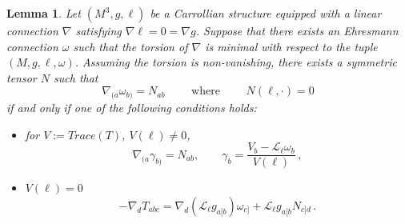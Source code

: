 \documentclass[10pt,a4paper]{amsart}
\newtheorem{lemma}{Lemma}
\begin{document}
\begin{lemma} \label{nonvanishing-torsion-lemma}
    Let $(M^3,g,\ell)$ be a Carrollian structure equipped with a linear connection $\nabla$ satisfying $\nabla \ell = 0 = \nabla g$.
    Suppose that there exists an Ehresmann connection $\omega$ such that the torsion of $\nabla$ is minimal with respect to the tuple $(M,g,\ell,\omega)$. Assuming the torsion is non-vanishing, there exists a symmetric tensor $N$ such that
    $$\nabla_{(a} \omega_{b)} = N_{ab}\qquad \text{ where } \qquad N(\ell, \cdot) = 0$$
    if and only if one of the following conditions holds:
        \begin{itemize}
        \item for $V := Trace(T)$,  $V(\ell) \neq 0$, 
        $$\nabla_{(a}\gamma_{b)} = N_{ab}, \qquad \gamma_b = \frac{V_b-\mathcal{L}_\ell \omega_b}{V(\ell)} \,, $$
        \item $V(\ell) = 0$  
        $$-\nabla_d T_{abc} = \nabla_d (\mathcal{L}_\ell g_{a[b}) \omega_{c]} + \mathcal{L}_\ell g_{a[b} N_{c]d}\,. $$
    \end{itemize}
\end{lemma}
\end{document}
